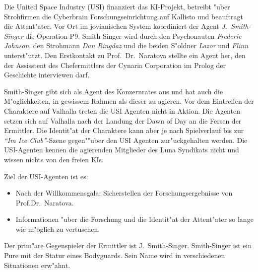 \newpage
{}

Die United Space Industry (USI) finanziert das KI-Projekt, betreibt "uber Strohfirmen die Cyberbrain Forschungseinrichtung auf Kallisto und beauftragt die Attent"ater. Vor Ort im jovianischen System koordiniert der Agent \emph{J.~Smith-Singer} die Operation P9. Smith-Singer wird durch den Psychonauten \emph{Frederic Johnson}, den Strohmann \emph{Dan Ringdaz} und die beiden S"oldner \emph{Lazor} und \emph{Flinn} unterst"utzt. Den Erstkontakt zu Prof.~Dr.~Naratova stellte ein Agent her, den der Assisstent des Chefermittlers der Cynaria Corporation  im Prolog der Geschichte interviewen darf.

Smith-Singer gibt sich als Agent des Konzernrates aus und hat auch die M"oglichkeiten, in gewissem Rahmen als dieser zu agieren. Vor dem Eintreffen der Charaktere auf Valhalla treten die USI Agenten nicht in Aktion. Die Agenten setzen sich auf Valhalla nach der Landung der Dawn of Day an die Fersen der Ermittler. Die Identit"at der Charaktere kann aber je nach Spielverlauf bis zur \emph{"`Im Ice Club"'}-Szene gegen""uber den USI Agenten zur"uckgehalten werden. Die USI-Agenten kennen die agierenden Mitglieder des Luna Syndikats nicht und wissen nichts von den freien KIs.

Ziel der USI-Agenten ist es:

\begin{itemize}
    \item Nach der Willkommensgala: Sicherstellen der Forschungsergebnisse von Prof.Dr.~Naratova.
    \item Informationen "uber die Forschung und die Identit"at der Attent"ater so lange wie m"oglich zu vertuschen.    
\end{itemize}

Der prim"are Gegenspieler der Ermittler ist J.~Smith-Singer. Smith-Singer ist ein Pure mit der Statur eines Bodyguards. Sein Name wird in verschiedenen Situationen erw"ahnt.
\vfill
\pagebreak

